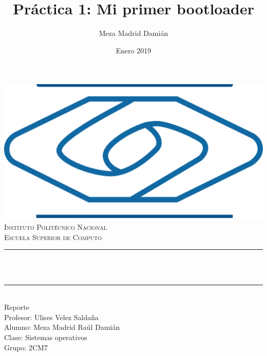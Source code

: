 \documentclass[12pt]{article}
\title{Práctica 1: Mi primer bootloader}%
\author{Meza Madrid Damián}%
\date{Enero 2019}%
\makeatletter
\let\thetitle\@title
\makeatother
\begin{document}

\begin{titlepage}
	\centering
    \vspace*{0.5 cm}
    \includegraphics[scale = 0.30]{escom.png}\\[1.0 cm]	%
	\textsc{\Large Instituto Politécnico Nacional}\\[0.5 cm]%
	\textsc{\Large Escuela Superior de Computo}\\[0.5 cm]%
	\rule{\linewidth}{0.2 mm} \\[0.4 cm]
	{ \huge \bfseries \thetitle}\\
	\rule{\linewidth}{0.2 mm} \\[1.5 cm]
	Reporte\\
	Profesor: Ulises Velez Saldaña \\
	Alumno: Meza Madrid Raúl Damián\\
    Clase: Sistemas operativos\\
    Grupo: 2CM7\\
\end{titlepage}
\end{document}

